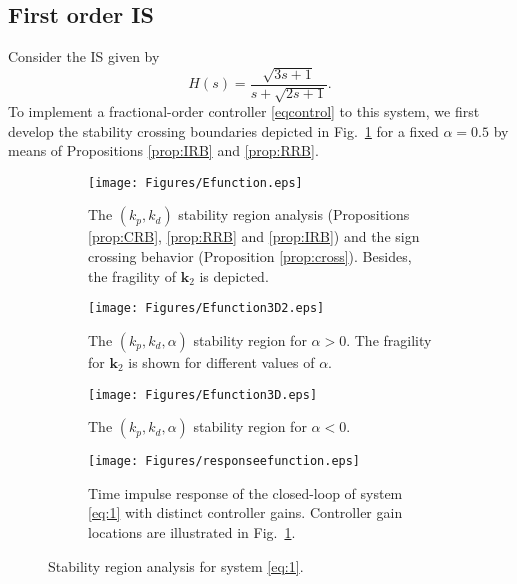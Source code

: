 \documentclass[twoside,reqno,11pt]{fcaa-var} %
\begin{document}
\subsection{First order IS}
Consider the IS given by
\begin{equation}
H(s)=\frac{\sqrt{3s+1}}{s+\sqrt{2s+1}}. \label{eq:1}
\end{equation}
To implement a fractional-order controller \eqref{eqcontrol} to this system, we first develop the stability crossing boundaries depicted in Fig.~\ref{SRegion2a} for a fixed $\alpha=0.5$ by means of Propositions \ref{prop:IRB} and \ref{prop:RRB}.\par
\begin{figure}%
	\centering %
	\begin{subfigure}[b]{0.48\columnwidth}
		\centering
		\texttt{[image: Figures/Efunction.eps]}
		\caption{The $(k_p,k_d)$ stability region analysis (Propositions \ref{prop:CRB}, \ref{prop:RRB} and \ref{prop:IRB}) and  the sign crossing behavior (Proposition \ref{prop:cross}). Besides, the fragility of $\bm{k}_2$ is depicted.}
		\label{SRegion2a}
	\end{subfigure}
	\hfill
	\begin{subfigure}[b]{0.48\columnwidth}
		\centering
		\texttt{[image: Figures/Efunction3D2.eps]}
		\caption{The $(k_p,k_d,\alpha)$ stability region for $\alpha>0$. The fragility for  $\bm{k}_2$ is shown for different values of $\alpha$.}
		\label{SRegion2c}
	\end{subfigure}
	\hfill
	\begin{subfigure}[b]{0.48\columnwidth}
		\centering
		\texttt{[image: Figures/Efunction3D.eps]}
		\caption{The $(k_p,k_d,\alpha)$ stability region for $\alpha<0$.}
		\label{SRegion2b}
	\end{subfigure}
	\hfill
	\begin{subfigure}[b]{0.48\columnwidth}
		\centering
		\texttt{[image: Figures/responseefunction.eps]}
		\caption{Time impulse response of the closed-loop of system \eqref{eq:1} with distinct controller gains. Controller gain locations are illustrated in Fig.~\ref{SRegion2a}.}
		\label{Responseefunction}
	\end{subfigure}
	\caption{Stability region analysis for system \eqref{eq:1}.}\label{SRegion2}
\end{figure}
\end{document}
